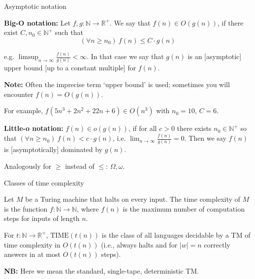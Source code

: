 \documentclass[handout]{beamer}
\begin{document}
\begin{frame}{Asymptotic notation}
    
    \textbf{Big-O notation:} Let $f,g: \mathbb{N}\to \mathbb{R}^+$. We say that \alert{$f(n)\in O(g(n))$}, if there exist $C,n_0\in \mathbb{N}^+$ such that
    $$
    (\forall n\geq n_0)\ f(n)\leq C\cdot g(n)
    $$

    e.g. $\limsup_{n\to\infty}\frac{f(n)}{g(n)}<\infty$. In that case we say that $g(n)$ is an [asymptotic] \alert{upper bound} [up to a constant multiple] for $f(n)$. 
    
    \textbf{Note:} Often the imprecise term `upper bound' is used; sometimes you will encounter $f(n)=O(g(n))$.

    For example, $f(5n^3+2n^2+22n+6)\in O(n^3)$ with $n_0=10$, $C=6$.

    \medskip

    \textbf{Little-o notation:} \alert{$f(n)\in o(g(n))$}, if for all $c>0$ there exists $n_0\in \mathbb{N}^+$ so that
    $(\forall n\geq n_0)\ f(n)<c\cdot g(n)$, i.e. $\lim_{n\to\infty}\frac{f(n)}{g(n)}=0$. Then we say $f(n)$ is [asymptotically] \alert{dominated} by $g(n)$.
    
    Analogously for $\geq$ instead of $\leq$:  $\Omega,\omega$.

\end{frame}


\begin{frame}{Classes of time complexity}

    \begin{definition}
        Let $M$ be a Turing machine that halts on every input. The \alert{time complexity} of $M$ is the function $f:\mathbb{N}\to \mathbb{N}$, where $f(n)$ is the maximum number of computation steps for inputs of length $n$.
    \end{definition}
    
    \begin{definition}
        For $t:\mathbb{N}\to \mathbb{R}^+$, \alert{$\mathrm{TIME}(t(n))$} is the class of all languages decidable by a TM of time complexity in $O(t(n))$ (i.e., always halts and for $|w|=n$ correctly answers in at most $O(t(n))$ steps).
    \end{definition}

    \textbf{NB:} Here we mean the standard, single-tape, deterministic TM.
    
\end{frame}
\end{document}
